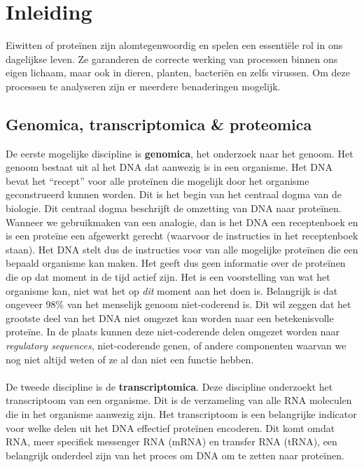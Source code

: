 \chapter{Inleiding}\label{ch:introductie}

Eiwitten of proteïnen zijn alomtegenwoordig en spelen een essentiële rol in ons dagelijkse leven.
Ze garanderen de correcte werking van processen binnen ons eigen lichaam, maar ook in dieren, planten, bacteriën en zelfs virussen.
Om deze processen te analyseren zijn er meerdere benaderingen mogelijk.


\section{Genomica, transcriptomica \& proteomica}\label{sec:genomica-transcriptomica-&-proteomica}
De eerste mogelijke discipline is \textbf{genomica}, het onderzoek naar het genoom.
Het genoom bestaat uit al het DNA dat aanwezig is in een organisme.
Het DNA bevat het ``recept'' voor alle proteïnen die mogelijk door het organisme geconstrueerd kunnen worden.
Dit is het begin van het centraal dogma van de biologie.
Dit centraal dogma beschrijft de omzetting van DNA naar proteïnen.
Wanneer we gebruikmaken van een analogie, dan is het DNA een receptenboek en is een proteïne een afgewerkt gerecht (waarvoor de instructies in het receptenboek staan).
Het DNA stelt dus de instructies voor van alle mogelijke proteïnen die een bepaald organisme kan maken.
Het geeft dus geen informatie over de proteïnen die op dat moment in de tijd actief zijn.
Het is een voorstelling van wat het organisme kan, niet wat het op \textit{dit} moment aan het doen is.
Belangrijk is dat ongeveer 98\% van het menselijk genoom niet-coderend is.
Dit wil zeggen dat het grootste deel van het DNA niet omgezet kan worden naar een betekenisvolle proteïne.
In de plaats kunnen deze niet-coderende delen omgezet worden naar \textit{regulatory sequences}, niet-coderende genen, of andere componenten waarvan we nog niet altijd weten of ze al dan niet een functie hebben.
\\ \\
De tweede discipline is de \textbf{transcriptomica}.
Deze discipline onderzoekt het transcriptoom van een organisme.
Dit is de verzameling van alle RNA moleculen die in het organisme aanwezig zijn.
Het transcriptoom is een belangrijke indicator voor welke delen uit het DNA effectief proteïnen encoderen.
Dit komt omdat RNA, meer specifiek messenger RNA (mRNA) en transfer RNA (tRNA), een belangrijk onderdeel zijn van het proces om DNA om te zetten naar proteïnen.
